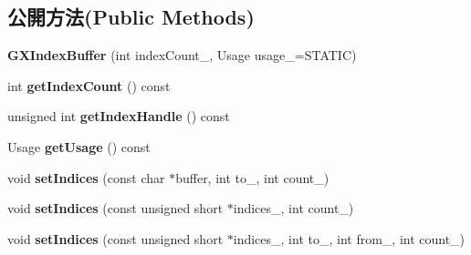\subsection*{公開方法(Public Methods)}
\begin{DoxyCompactItemize}
\item 
{\bfseries G\+X\+Index\+Buffer} (int index\+Count\+\_\+, Usage usage\+\_\+=S\+T\+A\+T\+IC)\hypertarget{class_i_dream_sky_1_1_g_x_index_buffer_a223275b2b68a8dcbdcba9f5c7f700d7e}{}\label{class_i_dream_sky_1_1_g_x_index_buffer_a223275b2b68a8dcbdcba9f5c7f700d7e}

\item 
int {\bfseries get\+Index\+Count} () const \hypertarget{class_i_dream_sky_1_1_g_x_index_buffer_a9359412cd1d50ac405f494b59796e008}{}\label{class_i_dream_sky_1_1_g_x_index_buffer_a9359412cd1d50ac405f494b59796e008}

\item 
unsigned int {\bfseries get\+Index\+Handle} () const \hypertarget{class_i_dream_sky_1_1_g_x_index_buffer_aeb4150ffb39cff083566b8e38b465f20}{}\label{class_i_dream_sky_1_1_g_x_index_buffer_aeb4150ffb39cff083566b8e38b465f20}

\item 
Usage {\bfseries get\+Usage} () const \hypertarget{class_i_dream_sky_1_1_g_x_index_buffer_aa458ec9bc4fae95d4a1b2d858b6ff12c}{}\label{class_i_dream_sky_1_1_g_x_index_buffer_aa458ec9bc4fae95d4a1b2d858b6ff12c}

\item 
void {\bfseries set\+Indices} (const char $\ast$buffer, int to\+\_\+, int count\+\_\+)\hypertarget{class_i_dream_sky_1_1_g_x_index_buffer_a420c924ec70ede539a4d0d74f8642416}{}\label{class_i_dream_sky_1_1_g_x_index_buffer_a420c924ec70ede539a4d0d74f8642416}

\item 
void {\bfseries set\+Indices} (const unsigned short $\ast$indices\+\_\+, int count\+\_\+)\hypertarget{class_i_dream_sky_1_1_g_x_index_buffer_a3a91a60bc4b89d82cb8b76ed320ae61b}{}\label{class_i_dream_sky_1_1_g_x_index_buffer_a3a91a60bc4b89d82cb8b76ed320ae61b}

\item 
void {\bfseries set\+Indices} (const unsigned short $\ast$indices\+\_\+, int to\+\_\+, int from\+\_\+, int count\+\_\+)\hypertarget{class_i_dream_sky_1_1_g_x_index_buffer_ad1c0eeea6ae234f910c62a0b5ef45260}{}\label{class_i_dream_sky_1_1_g_x_index_buffer_ad1c0eeea6ae234f910c62a0b5ef45260}

\end{DoxyCompactItemize}

